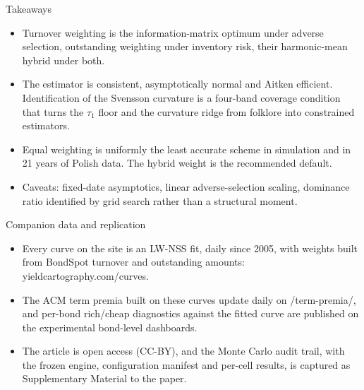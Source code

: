 \documentclass[aspectratio=169,11pt]{beamer}
\begin{document}
\begin{frame}{Takeaways}
  \begin{itemize}
    \item Turnover weighting is the information-matrix optimum under adverse
          selection, outstanding weighting under inventory risk, their
          harmonic-mean hybrid under both.
    \item The estimator is consistent, asymptotically normal and Aitken
          efficient. Identification of the Svensson curvature is a four-band
          coverage condition that turns the $\tau_1$ floor and the curvature
          ridge from folklore into constrained estimators.
    \item Equal weighting is uniformly the least accurate scheme in
          simulation and in 21 years of Polish data. The hybrid weight is the
          recommended default.
    \item Caveats: fixed-date asymptotics, linear adverse-selection scaling,
          dominance ratio identified by grid search rather than a structural
          moment.
  \end{itemize}
\end{frame}

\begin{frame}{Companion data and replication}
  \begin{itemize}
    \item Every curve on the site is an LW-NSS fit, daily since 2005, with
          weights built from BondSpot turnover and outstanding amounts:
          \textcolor{ycaccent}{\ttfamily yieldcartography.com/curves}.
    \item The ACM term premia built on these curves update daily on
          \textcolor{ycaccent}{\ttfamily /term-premia/}, and per-bond
          rich/cheap diagnostics against the fitted curve are published on
          the experimental bond-level dashboards.
    \item The article is open access (CC-BY), and the Monte Carlo audit
          trail, with the frozen engine, configuration manifest and per-cell
          results, is captured as Supplementary Material to the paper.
  \end{itemize}
\end{frame}
\end{document}
